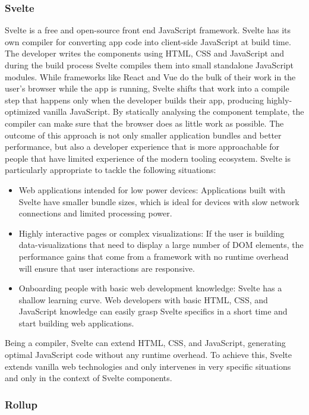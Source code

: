 \documentclass[english,bachelors,forcepolishlogotype]{wizthesis}
\newcommand{\paraphrase}[1]{#1}
\begin{document}
\subsubsection*{Svelte}

Svelte \cite{svelte} is a free and open-source front end JavaScript framework.
Svelte has its own compiler for converting app code into client-side JavaScript
at build time. \paraphrase{The developer writes the components using HTML, CSS
and JavaScript and during the build process Svelte compiles them into small
standalone JavaScript modules. While frameworks like React and Vue do the bulk
of their work in the user's browser while the app is running, Svelte shifts that
work into a compile step that happens only when the developer builds their app,
producing highly-optimized vanilla JavaScript. By statically analysing the
component template, the compiler can make sure that the browser does as little
work as possible. The outcome of this approach is not only smaller application
bundles and better performance, but also a developer experience that is more
approachable for people that have limited experience of the modern tooling
ecosystem. Svelte is particularly appropriate to tackle the following
situations:
\begin{itemize}
  \item Web applications intended for low power devices: Applications built with
  Svelte have smaller bundle sizes, which is ideal for devices with slow network
  connections and limited processing power.
  \item Highly interactive pages or complex visualizations: If the user is
  building data-visualizations that need to display a large number of DOM
  elements, the performance gains that come from a framework with no runtime
  overhead will ensure that user interactions are responsive.
  \item Onboarding people with basic web development knowledge: Svelte has a
  shallow learning curve. Web developers with basic HTML, CSS, and JavaScript
  knowledge can easily grasp Svelte specifics in a short time and start building
  web applications.
\end{itemize}

Being a compiler, Svelte can extend HTML, CSS, and JavaScript, generating
optimal JavaScript code without any runtime overhead. To achieve this, Svelte
extends vanilla web technologies and only intervenes in very specific situations
and only in the context of Svelte components.}

\subsubsection*{Rollup}
\end{document}
